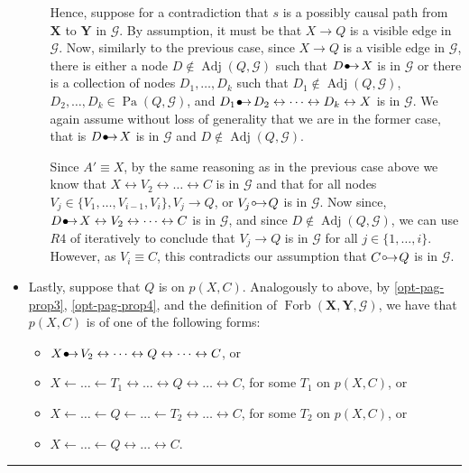 \documentclass[twoside]{article}
\DeclareMathOperator{\Pa}{Pa}
\DeclareMathOperator{\Adj}{Adj}
\DeclareMathOperator{\Forb}{Forb}
\newcommand{\fb}[2][X,Y]{\Forb(\mb{#1},#2)}
\newcommand{\mb}[1]{\mathbf{#1}}
\newcommand{\g}[1][G]{\mathcal{#1}}
\newenvironment{proofof}[1][]{\begin{trivlist}
\item[\hskip \labelsep {\bfseries Proof of #1.}]}{\hfill\BlackBox\end{trivlist}}
\newcommand{\BlackBox}{\rule{1.5ex}{1.5ex}}
\newcommand{\bulletarrow}{
  \setlength{\unitlength}{1mm}
  \begin{picture}(5,1)(0,0)
    \put(0.2,0){$\bullet$}
    \put(1,0){$\rightarrow$}
  \end{picture}
}
\newcommand{\circarrow}{
  \setlength{\unitlength}{1mm}
  \begin{picture}(5,1)(0,0)
    \put(1,1){\circle{1}}
    \put(1.2,0){$\rightarrow$}
  \end{picture}
}
\begin{document}
\begin{proofof}[Lemma \ref{lem:adjust-and-o-pag-helper}]
\begin{itemize}
\begin{itemize}
             Hence, suppose for a contradiction that $s$ is a possibly causal path from $\mb{X}$ to $\mb{Y}$ in $\g$. By assumption, it must be that $X \to Q$ is a visible edge in $\g$. Now, similarly to the previous case, since $X \to Q$ is a visible edge in $\g$, there is either a node $D \notin \Adj(Q, \g)$ such that $D \bulletarrow X$ is in $\g$ or there is a collection of nodes $D_1, \dots, D_k$ such that $D_1 \notin \Adj(Q, \g)$, $D_2, \dots, D_k \in \Pa(Q, \g)$, and $D_1 \bulletarrow D_2 \leftrightarrow \dots \leftrightarrow D_k \leftrightarrow X$ is in $\g$. We again assume without loss of generality that we are in the former case, that is $D \bulletarrow X$ is in $\g$ and $D \notin \Adj(Q, \g)$. 
        
        Since $A' \equiv X$, by the same reasoning as in the previous case above we know that $X \leftrightarrow V_2 \leftrightarrow \dots \leftrightarrow C$ is in $\g$ and that for all nodes $V_j\in \{V_1, \dots, V_{i-1}, V_i\}, V_j \to Q$, or $V_j \circarrow Q$ is in $\g$. Now since, $D \bulletarrow X \leftrightarrow  V_2 \leftrightarrow \dots \leftrightarrow C$ is in $\g$, and since $D \notin \Adj(Q, \g)$, we can use $R4$ of \cite{zhang2008completeness} iteratively to conclude that $V_j \to Q$ is in $\g$ for all $j \in \{1,\dots, i\}$. However, as $V_i \equiv C$, this contradicts our assumption that $C \circarrow Q$ is in $\g$.        
        \end{itemize}
    
        \item Lastly, suppose that $Q$ is on $p(X,C)$. Analogously to above, by \ref{opt-pag-prop3}, \ref{opt-pag-prop4}, and the definition of $\fb{\g}$, we have that $p(X,C)$ is of one of the following forms:
        \begin{itemize}
            \item $X \bulletarrow V_2 \leftrightarrow \dots \leftrightarrow Q \leftrightarrow \dots \leftrightarrow C$, or
            \item  $X \leftarrow \dots \leftarrow T_1 \leftrightarrow \dots \leftrightarrow Q \leftrightarrow \dots \leftrightarrow C$, for some $T_1$ on $p(X,C)$,  or
            \item $X \leftarrow \dots \leftarrow Q \leftarrow \dots \leftarrow T_2 \leftrightarrow \dots \leftrightarrow C$, for some  $T_2$ on $p(X,C)$, or 
            \item $X \leftarrow \dots  \leftarrow Q \leftrightarrow \dots \leftrightarrow C$. 
        \end{itemize}


\end{itemize}
\end{proofof}
\end{document}
